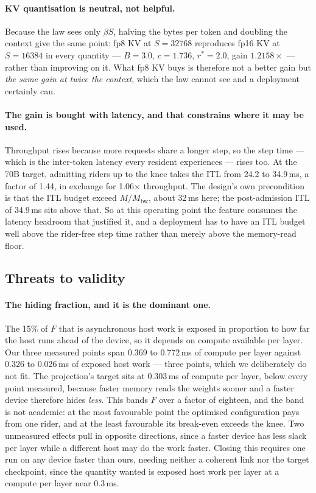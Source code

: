 \paragraph{KV quantisation is neutral, not helpful.} Because the law sees only
$\beta S$, halving the bytes per token and doubling the context give the same
point: fp8 KV at $S{=}32768$ reproduces fp16 KV at $S{=}16384$ in every
quantity --- $B{=}3.0$, $c{=}1.736$, $r^{*}{=}2.0$, gain $1.2158\times$ ---
rather than improving on it. What fp8 KV buys is therefore not a better gain but
\emph{the same gain at twice the context}, which the law cannot see and a
deployment certainly can.

\paragraph{The gain is bought with latency, and that constrains where it may be
used.} Throughput rises because more requests share a longer step, so the step
time --- which is the inter-token latency every resident experiences --- rises
too. At the 70B target, admitting riders up to the knee takes the ITL from 24.2
to 34.9\,ms, a factor of 1.44, in exchange for 1.06$\times$ throughput. The
design's own precondition is that the ITL budget exceed $M/M_{\textrm{bw}}$,
about 32\,ms here; the post-admission ITL of 34.9\,ms sits above that. So at this
operating point the feature consumes the latency headroom that justified it, and
a deployment has to have an ITL budget well above the rider-free step time rather
than merely above the memory-read floor.

\subsection{Threats to validity}
\label{sec:overhead:threats}

\paragraph{The hiding fraction, and it is the dominant one.} The 15\% of $F$
that is asynchronous host work is exposed in proportion to how far the host runs
ahead of the device, so it depends on compute available per layer. Our three
measured points span 0.369 to 0.772\,ms of compute per layer against 0.326 to
0.026\,ms of exposed host work --- three points, which we deliberately do not
fit. The projection's target sits at 0.303\,ms of compute per layer, below every
point measured, because faster memory reads the weights sooner and a faster
device therefore hides \emph{less}. This bands $F$ over a factor of eighteen,
and the band is not academic: at the most favourable point the optimised
configuration pays from one rider, and at the least favourable its break-even
exceeds the knee. Two unmeasured effects pull in opposite directions, since a
faster device has less slack per layer while a different host may do the work
faster. Closing this requires one run on any device faster than ours, needing
neither a coherent link nor the target checkpoint, since the quantity wanted is
exposed host work per layer at a compute per layer near 0.3\,ms.

